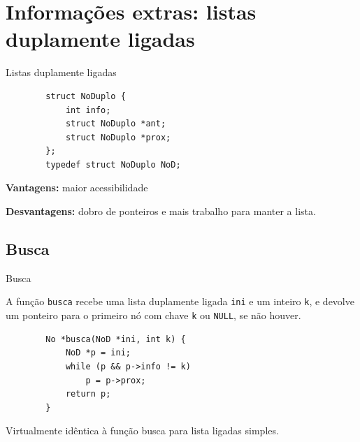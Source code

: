 \documentclass{beamer}
\newcommand{\cod}[1]{\texttt{#1}}
\begin{document}
\section{Informações extras: listas duplamente ligadas}

\begin{frame}[fragile]{Listas duplamente ligadas}

    \begin{verbatim}
        struct NoDuplo {
            int info;
            struct NoDuplo *ant;
            struct NoDuplo *prox;
        };
        typedef struct NoDuplo NoD;
    \end{verbatim}

    \textbf{Vantagens:} maior acessibilidade

    \textbf{Desvantagens:} dobro de ponteiros e mais trabalho para manter a lista.

\end{frame}

\subsection{Busca}

\begin{frame}[fragile]{Busca}

    A função \cod{busca} recebe uma lista duplamente ligada \cod{ini} e um inteiro \cod{k}, e devolve um ponteiro para o primeiro nó com chave \cod{k} ou \cod{NULL}, se não houver.

    \begin{verbatim}
        No *busca(NoD *ini, int k) {
            NoD *p = ini;
            while (p && p->info != k)
                p = p->prox;
            return p;
        }
    \end{verbatim}

    Virtualmente idêntica à função busca para lista ligadas simples.
\end{frame}
\end{document}
